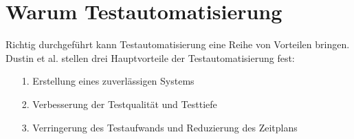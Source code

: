 \section{Warum Testautomatisierung}
\label{sec:warum_testautomatisierung}

Richtig durchgeführt kann Testautomatisierung eine Reihe von Vorteilen bringen. Dustin et al. \cite[S.44 ff.]{dustin_software_2001} stellen drei Hauptvorteile der Testautomatisierung fest:
\begin{itemize}
\item[1.] Erstellung eines zuverlässigen Systems
\item[2.] Verbesserung der Testqualität und Testtiefe
\item[3.] Verringerung des Testaufwands und Reduzierung des Zeitplans
\end{itemize}


